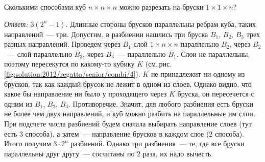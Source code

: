 \problem
Сколькими способами куб $n \times n \times n$ можно разрезать на бруски
$1 \times 1 \times n$?

%
\label{solution:2012/regatta/senior/combi/4}%
\emph{Ответ:} $3(2^n - 1)$.
Длинные стороны брусков параллельны ребрам куба, таких направлений~--- три.
Допустим, в разбиении нашлись три бруска $B_1$, $B_2$, $B_3$ трех разных
направлений.
Проведем через $B_1$ слой $1 \times n \times n$ параллельно $B_2$,
через $B_2$~--- слой параллельно $B_3$, через $B_3$~--- параллельно $B_1$.
Слои не параллельны, поэтому пересекутся по какому-то кубику $K$
(см.\,рис.\,\ref{fig:solution:2012/regatta/senior/combi/4}).
$K$ не принадлежит ни одному из брусков, так как каждый брусок не лежит в
одном из слоев.
Однако видно, что какое бы направление ни было у проходящего через $K$ бруска,
он пересечется с одним из $B_1$, $B_2$, $B_3$.
Противоречие.
Значит, для любого разбиения есть бруски не более чем двух направлений, и куб
можно разбить на параллельные им слои.
При подсчете числа разбиений будем сначала выбирать направление слоев
(тут есть 3 способа), а затем~--- направление брусков в каждом слое
(2 способа).
Итого получим $3 \cdot 2^n$ разбиений.
Однако три разбиения~--- те, где все бруски параллельны друг другу~---
сосчитаны по 2 раза, их надо вычесть.

\endproblem
